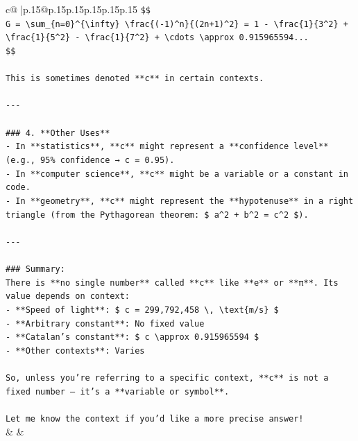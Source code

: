 \documentclass{article}
\begin{document}
{\begin{supertabular}{c@{$\;$}|p{.15\linewidth}@{}p{.15\linewidth}p{.15\linewidth}p{.15\linewidth}p{.15\linewidth}p{.15\linewidth}}
{{{\texttt{\$\$} \\
\texttt{G = \textbackslash{}sum\_\{n=0\}\^{}\{\textbackslash{}infty\} \textbackslash{}frac\{({-}1)\^{}n\}\{(2n+1)\^{}2\} = 1 {-} \textbackslash{}frac\{1\}\{3\^{}2\} + \textbackslash{}frac\{1\}\{5\^{}2\} {-} \textbackslash{}frac\{1\}\{7\^{}2\} + \textbackslash{}cdots \textbackslash{}approx 0.915965594...} \\
\texttt{\$\$} \\
\\ 
\texttt{This is sometimes denoted **c** in certain contexts.} \\
\\ 
\texttt{{-}{-}{-}} \\
\\ 
\texttt{\#\#\# 4. **Other Uses**} \\
\texttt{{-} In **statistics**, **c** might represent a **confidence level** (e.g., 95\% confidence → c = 0.95).} \\
\texttt{{-} In **computer science**, **c** might be a variable or a constant in code.} \\
\texttt{{-} In **geometry**, **c** might represent the **hypotenuse** in a right triangle (from the Pythagorean theorem: \$ a\^{}2 + b\^{}2 = c\^{}2 \$).} \\
\\ 
\texttt{{-}{-}{-}} \\
\\ 
\texttt{\#\#\# Summary:} \\
\texttt{There is **no single number** called **c** like **e** or **π**. Its value depends on context:} \\
\texttt{{-} **Speed of light**: \$ c = 299,792,458 \textbackslash{}, \textbackslash{}text\{m/s\} \$} \\
\texttt{{-} **Arbitrary constant**: No fixed value} \\
\texttt{{-} **Catalan's constant**: \$ c \textbackslash{}approx 0.915965594 \$} \\
\texttt{{-} **Other contexts**: Varies} \\
\\ 
\texttt{So, unless you're referring to a specific context, **c** is not a fixed number — it's a **variable or symbol**.} \\
\\ 
\texttt{Let me know the context if you'd like a more precise answer!} \\
            }
        }
    }
    & & \\ \\


\end{supertabular}}
\end{document}
